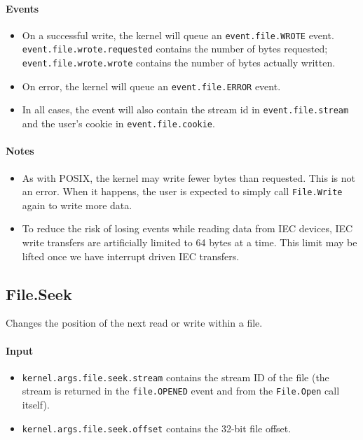 \paragraph{Events}
\begin{itemize}
\item On a successful write, the kernel will queue an \verb+event.file.WROTE+ event. \\ \verb+event.file.wrote.requested+ contains the number of bytes requested; \\ \verb+event.file.wrote.wrote+ contains the number of bytes actually written.
\item On error, the kernel will queue an \verb+event.file.ERROR+ event.
\item In all cases, the event will also contain the stream id in \verb+event.file.stream+ and the user's cookie in \verb+event.file.cookie+.
\end{itemize}

\paragraph{Notes}
\begin{itemize}
\item As with POSIX, the kernel may write fewer bytes than requested.  This is not an error.  When it happens, the user is expected to simply call \verb+File.Write+ again to write more data.

\item To reduce the risk of losing events while reading data from IEC devices, IEC write transfers are artificially limited to 64 bytes at a time.  This limit may be lifted once we have interrupt driven IEC transfers.
\end{itemize}

\subsection*{File.Seek}
Changes the position of the next read or write within a file.

\paragraph{Input}
\begin{itemize}
\item \verb+kernel.args.file.seek.stream+ contains the stream ID of the file (the stream is returned in the \verb+file.OPENED+ event and from the \verb+File.Open+ call itself).
\item \verb+kernel.args.file.seek.offset+ contains the 32-bit file offset.
\end{itemize}

